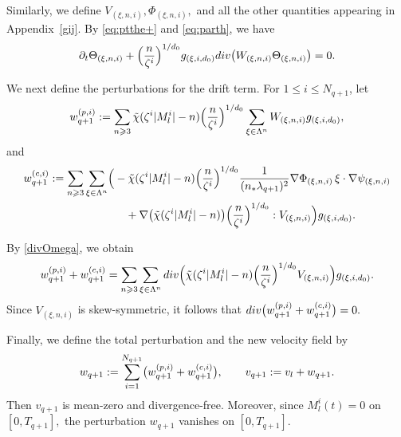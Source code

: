 \documentclass[10pt,a4paper]{amsart}
\numberwithin{equation}{section}
\def\geq{\geqslant}
\def\leq{\leqslant}
\def\div{\mathord{{\rm div}}}
\def\geq{\geqslant}
\def\leq{\leqslant}
\def\div{\mathord{{\rm div}}}
\begin{document}
Similarly, we define
$
V_{(\xi,n,i)},
\Phi_{(\xi,n,i)},
$
and all the other quantities appearing in Appendix~\ref{gij}. 
By \eqref{eq:ptthe+} and \eqref{eq:parth}, we have
\begin{align}
\partial_t\Theta_{(\xi,n,i)}
+
\Bigl(\frac{n}{\zeta^i}\Bigr)^{1/d_0}
g_{(\xi,i,d_0)}
\div\bigl(
W_{(\xi,n,i)}\Theta_{(\xi,n,i)}
\bigr)
=
0.
\label{eq:4ptthe+n}
\end{align}

We next define the perturbations for the drift term. 
For $1\leq i\leq N_{q+1}$, let
\begin{align*}
w_{q+1}^{(p,i)}
:=
\sum_{n\geq3}
\tilde{\chi}(\zeta^i|M_l^i|-n)
\Bigl(\frac{n}{\zeta^i}\Bigr)^{1/d_0}
\sum_{\xi\in\Lambda^n}
W_{(\xi,n,i)}g_{(\xi,i,d_0)},
\end{align*}
and
\begin{align*}
w_{q+1}^{(c,i)}
:=
\sum_{n\geq3}
\sum_{\xi\in\Lambda^n}
\Bigl(
&
-\tilde{\chi}(\zeta^i|M_l^i|-n)
\Bigl(\frac{n}{\zeta^i}\Bigr)^{1/d_0}
\frac1{(n_*\lambda_{q+1})^2}
\nabla\Phi_{(\xi,n,i)}
\,\xi\cdot\nabla\psi_{(\xi,n,i)}
\\
&\quad
+
\nabla\bigl(
\tilde{\chi}(\zeta^i|M_l^i|-n)
\bigr)
\Bigl(\frac{n}{\zeta^i}\Bigr)^{1/d_0}
:V_{(\xi,n,i)}
\Bigr)
g_{(\xi,i,d_0)}.
\end{align*}

By \eqref{divOmega}, we obtain
\begin{align}
w_{q+1}^{(p,i)}
+
w_{q+1}^{(c,i)}
=
\sum_{n\geq3}
\sum_{\xi\in\Lambda^n}
\div\Bigl(
\tilde{\chi}(\zeta^i|M_l^i|-n)
\Bigl(\frac{n}{\zeta^i}\Bigr)^{1/d_0}
V_{(\xi,n,i)}
\Bigr)
g_{(\xi,i,d_0)}.
\label{eq:4wq+1p+wq+1c}
\end{align}
Since $V_{(\xi,n,i)}$ is skew-symmetric, it follows that
$
\div\bigl(
w_{q+1}^{(p,i)}
+
w_{q+1}^{(c,i)}
\bigr)=0.
$

Finally, we define the total perturbation and the new velocity field by
\begin{align}
w_{q+1}
:=
\sum_{i=1}^{N_{q+1}}
\bigl(
w_{q+1}^{(p,i)}
+
w_{q+1}^{(c,i)}
\bigr),
\qquad
v_{q+1}
:=
v_l+w_{q+1}.
\notag
\end{align}
Then $v_{q+1}$ is mean-zero and divergence-free.
Moreover, since $M_l^i(t)=0$ on $[0,T_{q+1}],$ the perturbation $w_{q+1} $  vanishes on $[0,T_{q+1}]$.
 
\end{document}
